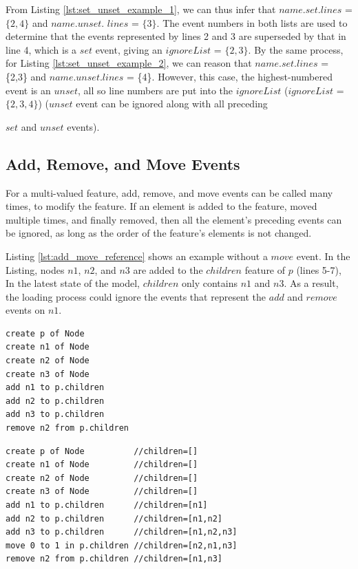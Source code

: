 \documentclass{llncs}
\begin{document}
    From Listing \ref{lst:set_unset_example_1}, we can thus infer that $name$.$set$.$lines$ = $\{2,4\}$ and $name$.$unset$. $lines$ = $\{3\}$. The event numbers in both lists are used to determine that the events represented by lines 2 and 3 are superseded by that in line 4, which is a $set$ event, giving an $ignoreList$ = $\{2, 3\}$.  By the same process, for Listing \ref{lst:set_unset_example_2}, we can reason that $name$.$set$.$lines$ = \{2,3\} and $name$.$unset$.$lines$ = \{4\}.  However, this case, the highest-numbered event is an $unset$, all so line numbers are put into the $ignoreList$ ($ignoreList$ = $\{2, 3, 4\}$) ($unset$ event can be ignored along with all preceding {$set$ and $unset$ events). 
    
    \vspace{-10pt}
    \subsection{Add, Remove, and Move Events}\label{subsec:add_remove_and_move_operations}
    For a multi-valued feature, add, remove, and move events can be called many times, to modify the feature. If an element is added to the feature, moved multiple times, and finally removed, then all the element's preceding events can be ignored, as long as the order of the feature's elements is not changed. 
    

    
    Listing \ref{lst:add_move_reference} shows an example without a $move$ event. In the Listing, nodes $n1$, $n2$, and $n3$ are added to the $children$ feature of $p$ (lines 5-7), In the latest state of the model, $children$ only contains $n1$ and $n3$. As a result, the loading process could ignore the events that represent the \textit{$add$} and \textit{$remove$} events on $n1$. 
    
    \vspace{-20pt}
    \begin{minipage}[t]{0.34\linewidth}
\begin{lstlisting}[style=eol,caption={A CBP of add and remove operations.},label=lst:add_move_reference]
create p of Node
create n1 of Node
create n2 of Node
create n3 of Node
add n1 to p.children
add n2 to p.children
add n3 to p.children
remove n2 from p.children   
\end{lstlisting}
    \end{minipage}
    \hfill
    \begin{minipage}[t]{0.62\linewidth}
\begin{lstlisting}[style=eol,caption={A CBP representation of add, move, and remove operations.},label=lst:add_remove_move_reference]
create p of Node          //children=[]
create n1 of Node         //children=[]
create n2 of Node         //children=[]
create n3 of Node         //children=[]
add n1 to p.children      //children=[n1]
add n2 to p.children      //children=[n1,n2]
add n3 to p.children      //children=[n1,n2,n3]
move 0 to 1 in p.children //children=[n2,n1,n3]
remove n2 from p.children //children=[n1,n3]
\end{lstlisting}
    \end{minipage}

}
\end{document}

